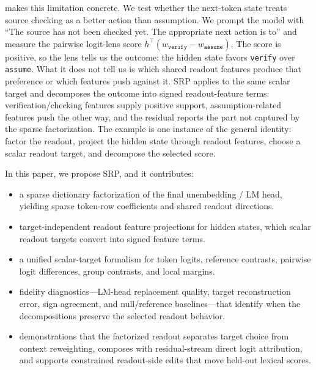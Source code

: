  makes this limitation concrete. We test
whether the next-token state treats source checking as a better action than
assumption. We prompt the model with ``The source has not been checked yet. The
appropriate next action is to'' and measure the pairwise logit-lens score
\(h^\top(w_{\texttt{verify}}-w_{\texttt{assume}})\). The score is positive, so
the lens tells us the outcome: the hidden state favors \texttt{verify} over
\texttt{assume}. What it does not tell us is which shared readout features
produce that preference or which features push against it. SRP applies to the
same scalar target and decomposes the outcome into signed readout-feature terms:
verification/checking features supply positive support, assumption-related
features push the other way, and the residual reports the part not captured by
the sparse factorization. The example is one instance of the general identity:
factor the readout, project the hidden state through readout features, choose a
scalar readout target, and decompose the selected score.

In this paper, we propose SRP, and it contributes:
\begin{itemize}
    \item a sparse dictionary factorization of the final unembedding / LM head,
    yielding sparse token-row coefficients and shared readout directions.
    \item target-independent readout feature projections for hidden states,
    which scalar readout targets convert into signed feature terms.
    \item a unified scalar-target formalism for token logits, reference
    contrasts, pairwise logit differences, group contrasts, and local margins.
    \item fidelity diagnostics---LM-head replacement quality, target
    reconstruction error, sign agreement, and null/reference baselines---that
    identify when the decompositions preserve the selected readout behavior.
    \item demonstrations that the factorized readout separates target choice
    from context reweighting, composes with residual-stream direct logit
    attribution, and supports constrained readout-side edits that move held-out
    lexical scores.
\end{itemize}
